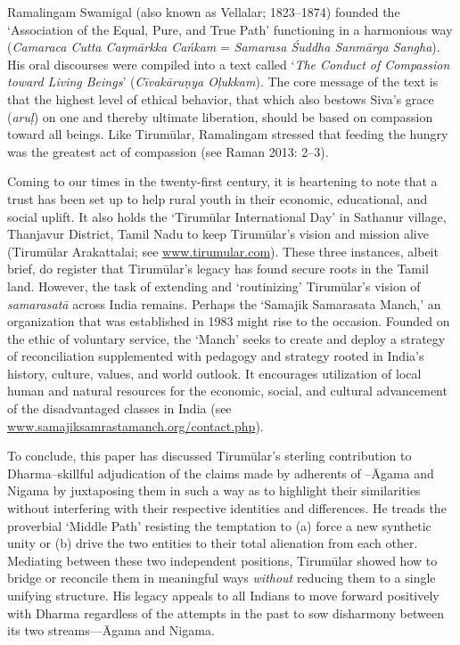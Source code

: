 Ramalingam Swamigal (also known as Vellalar; 1823–1874) founded the ‘Association of the Equal, Pure, and True Path’ functioning in a harmonious way (\textit{Camaraca Cutta Caŋmārkka Cańkam} = \textit{Samarasa Śuddha Sanmārga Sangha}). His oral discourses were compiled into a text called ‘\textit{The Conduct of Compassion toward Living Beings}’ (\textit{Cīvakāruṇya Oļukkam}). The core message of the text is that the highest level of ethical behavior, that which also bestows Siva’s grace (\textit{aruļ}) on one and thereby ultimate liberation, should be based on compassion toward all beings. Like Tirumūlar, Ramalingam stressed that feeding the hungry was the greatest act of compassion (see Raman 2013: 2–3).

Coming to our times in the twenty-first century, it is heartening to note that a trust has been set up to help rural youth in their economic, educational, and social uplift. It also holds the ‘Tirumūlar International Day’ in Sathanur village, Thanjavur District, Tamil Nadu to keep Tirumūlar’s vision and mission alive (Tirumūlar Arakattalai; see \url{www.tirumular.com}). These three instances, albeit brief, do register that Tirumūlar’s legacy has found secure roots in the Tamil land. However, the task of extending and ‘routinizing’ Tirumūlar’s vision of \textit{samarasatā} across India remains. Perhaps the ‘Samajik Samarasata Manch,’ an organization that was established in 1983 might rise to the occasion. Founded on the ethic of voluntary service, the ‘Manch’ seeks to create and deploy a strategy of reconciliation supplemented with pedagogy and strategy rooted in India’s history, culture, values, and world outlook. It encourages utilization of local human and natural resources for the economic, social, and cultural advancement of the disadvantaged classes in India (see \url{www.samajiksamrastamanch.org/contact.php}).

To conclude, this paper has discussed Tirumūlar’s sterling contribution to Dharma--skillful adjudication of the claims made by adherents of --Āgama and Nigama by juxtaposing them in such a way as to highlight their similarities without interfering with their respective identities and differences. He treads the proverbial ‘Middle Path’ resisting the temptation to (a) force a new synthetic unity or (b) drive the two entities to their total alienation from each other. Mediating between these two independent positions, Tirumūlar showed how to bridge or reconcile them in meaningful ways \textit{without} reducing them to a single unifying structure. His legacy appeals to all Indians to move forward positively with Dharma regardless of the attempts in the past to sow disharmony between its two streams—Āgama and Nigama.


